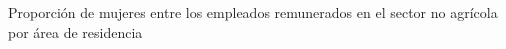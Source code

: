 Proporción de mujeres entre los empleados remunerados en el sector no agrícola por área de residencia